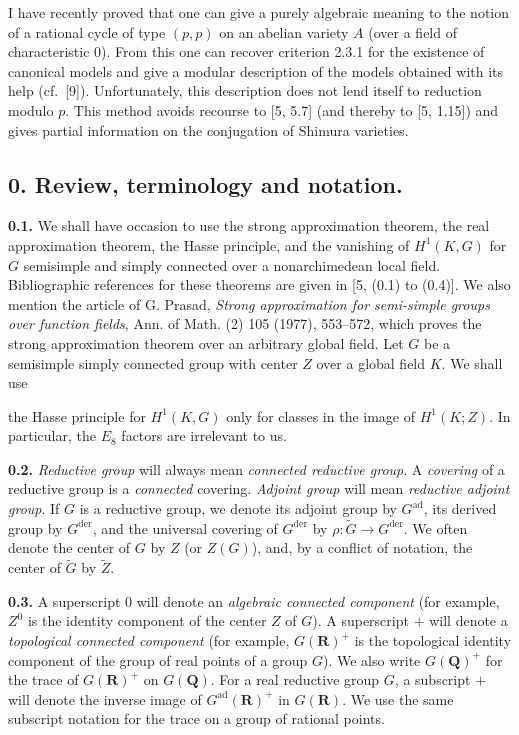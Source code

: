 \documentclass[10pt,a4paper]{article}
\newcommand{\SourcePage}[2]{\clearpage\setcounter{page}{#2}\typeout{D031_SOURCE_PAGE physical=#1 printed=#2}}
\begin{document}
I have recently proved that one can give a purely algebraic meaning to the notion of a rational cycle of type \((p,p)\) on an abelian variety \(A\) (over a field of characteristic 0). From this one can recover criterion 2.3.1 for the existence of canonical models and give a modular description of the models obtained with its help (cf.~{[}9{]}). Unfortunately, this description does not lend itself to reduction modulo \(p\). This method avoids recourse to {[}5, 5.7{]} (and thereby to {[}5, 1.15{]}) and gives partial information on the conjugation of Shimura varieties.

\subsection{0. Review, terminology and notation.}

\textbf{0.1.} We shall have occasion to use the strong approximation theorem, the real approximation theorem, the Hasse principle, and the vanishing of \(H^1(K,G)\) for \(G\) semisimple and simply connected over a nonarchimedean local field. Bibliographic references for these theorems are given in {[}5, (0.1) to (0.4){]}. We also mention the article of G. Prasad, \emph{Strong approximation for semi-simple groups over function fields}, Ann. of Math. (2) 105 (1977), 553--572, which proves the strong approximation theorem over an arbitrary global field. Let \(G\) be a semisimple simply connected group with center \(Z\) over a global field \(K\). We shall use

\SourcePage{5}{251}
the Hasse principle for \(H^1(K,G)\) only for classes in the image of \(H^1(K;Z)\). In particular, the \(E_8\) factors are irrelevant to us.

\textbf{0.2.} \emph{Reductive group} will always mean \emph{connected reductive group}. A \emph{covering} of a reductive group is a \emph{connected} covering. \emph{Adjoint group} will mean \emph{reductive adjoint group}. If \(G\) is a reductive group, we denote its adjoint group by \(G^{\mathrm{ad}}\), its derived group by \(G^{\mathrm{der}}\), and the universal covering of \(G^{\mathrm{der}}\) by \(\rho:\widetilde G\to G^{\mathrm{der}}\). We often denote the center of \(G\) by \(Z\) (or \(Z(G)\)), and, by a conflict of notation, the center of \(\widetilde G\) by \(\widetilde Z\).

\textbf{0.3.} A superscript \(0\) will denote an \emph{algebraic connected component} (for example, \(Z^0\) is the identity component of the center \(Z\) of \(G\)). A superscript \(+\) will denote a \emph{topological connected component} (for example, \(G(\mathbf R)^+\) is the topological identity component of the group of real points of a group \(G\)). We also write \(G(\mathbf Q)^+\) for the trace of \(G(\mathbf R)^+\) on \(G(\mathbf Q)\). For a real reductive group \(G\), a subscript \(+\) will denote the inverse image of \(G^{\mathrm{ad}}(\mathbf R)^+\) in \(G(\mathbf R)\). We use the same subscript notation for the trace on a group of rational points.
\end{document}
